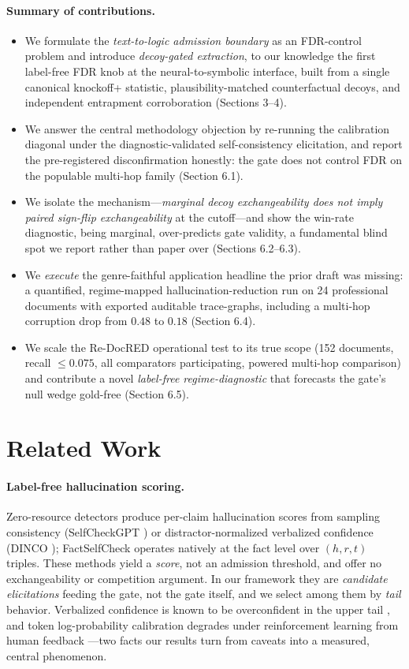 \documentclass[11pt,letterpaper]{article}
\begin{document}
\paragraph{Summary of contributions.}
\begin{itemize}
  \item We formulate the \emph{text-to-logic admission boundary} as an FDR-control problem and introduce \emph{decoy-gated extraction}, to our knowledge the first label-free FDR knob at the neural-to-symbolic interface, built from a single canonical knockoff+ statistic, plausibility-matched counterfactual decoys, and independent entrapment corroboration (Sections 3--4).
  \item We answer the central methodology objection by re-running the calibration diagonal under the diagnostic-validated self-consistency elicitation, and report the pre-registered disconfirmation honestly: the gate does not control FDR on the populable multi-hop family (Section 6.1).
  \item We isolate the mechanism---\emph{marginal decoy exchangeability does not imply paired sign-flip exchangeability} at the cutoff---and show the win-rate diagnostic, being marginal, over-predicts gate validity, a fundamental blind spot we report rather than paper over (Sections 6.2--6.3).
  \item We \emph{execute} the genre-faithful application headline the prior draft was missing: a quantified, regime-mapped hallucination-reduction run on 24 professional documents with exported auditable trace-graphs, including a multi-hop corruption drop from $0.48$ to $0.18$ (Section 6.4).
  \item We scale the Re-DocRED operational test to its true scope (152 documents, recall $\le0.075$, all comparators participating, powered multi-hop comparison) and contribute a novel \emph{label-free regime-diagnostic} that forecasts the gate's null wedge gold-free (Section 6.5).
\end{itemize}

\section{Related Work}

\paragraph{Label-free hallucination scoring.} Zero-resource detectors produce per-claim hallucination scores from sampling consistency (SelfCheckGPT \cite{Manakul2023}) or distractor-normalized verbalized confidence (DINCO \cite{Wang2025}); FactSelfCheck \cite{Sawczyn2025} operates natively at the fact level over $(h, r, t)$ triples. These methods yield a \emph{score}, not an admission threshold, and offer no exchangeability or competition argument. In our framework they are \emph{candidate elicitations} feeding the gate, not the gate itself, and we select among them by \emph{tail} behavior. Verbalized confidence is known to be overconfident in the upper tail \cite{Xiong2023}, and token log-probability calibration degrades under reinforcement learning from human feedback \cite{Tian2023}---two facts our results turn from caveats into a measured, central phenomenon.
\end{document}
